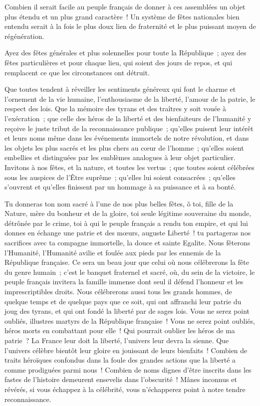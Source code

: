\documentclass[french,twoside]{book} %
\begin{document}
Combien il serait facile au peuple français de donner à ces assemblées un objet plus étendu et un plus grand caractère ! Un système de fêtes nationales bien entendu serait à la fois le plus doux lien de fraternité et le plus puissant moyen de régénération.\par
Ayez des fêtes générales et plus solennelles pour toute la République ; ayez des fêtes particulières et pour chaque lieu, qui soient des jours de repos, et qui remplacent ce que les circonstances ont détruit.\par
Que toutes tendent à réveiller les sentiments généreux qui font le charme et l’ornement de la vie humaine, l’enthousiasme de la liberté, l’amour de la patrie, le respect des lois. Que la mémoire des tyrans et des traîtres y soit vouée à l’exécration ; que celle des héros de la liberté et des bienfaiteurs de l’humanité y reçoive le juste tribut de la reconnaissance publique ; qu’elles puisent leur intérêt et leurs noms même dans les événements immortels de notre révolution, et dans les objets les plus sacrés et les plus chers au cœur de l’homme ; qu’elles soient embellies et distinguées par les emblèmes analogues à leur objet particulier. Invitons à nos fêtes, et la nature, et toutes les vertus ; que toutes soient célébrées sous les auspices de l’Être suprême ; qu’elles lui soient consacrées ; qu’elles s’ouvrent et qu’elles finissent par un hommage à sa puissance et à sa bonté.\par
Tu donneras ton nom sacré à l’une de nos plus belles fêtes, ô toi, fille de la Nature, mère du bonheur et de la gloire, toi seule légitime souveraine du monde, détrônée par le crime, toi à qui le peuple français a rendu ton empire, et qui lui donnes en échange une patrie et des mœurs, auguste Liberté ! tu partageras nos sacrifices avec ta compagne immortelle, la douce et sainte Egalite. Nous fêterons l’Humanité, l’Humanité avilie et foulée aux pieds par les ennemis de la République française. Ce sera un beau jour que celui où nous célébrerons la fête du genre humain ; c’est le banquet fraternel et sacré, où, du sein de la victoire, le peuple français invitera la famille immense dont seul il défend l’honneur et les imprescriptibles droits. Nous célébrerons aussi tous les grands hommes, de quelque temps et de quelque pays que ce soit, qui ont affranchi leur patrie du joug des tyrans, et qui ont fondé la liberté par de sages lois. Vous ne serez point oubliés, illustres martyrs de la République française ! Vous ne serez point oubliés, héros morts en combattant pour elle ! Qui pourrait oublier les héros de ma patrie ? La France leur doit la liberté, l’univers leur devra la sienne. Que l’univers célèbre bientôt leur gloire en jouissant de leurs bienfaits ! Combien de traits héroïques confondus dans la foule des grandes actions que la liberté a comme prodiguées parmi nous ! Combien de noms dignes d’être inscrits dans les fastes de l’histoire demeurent ensevelis dans l’obscurité ! Mânes inconnus et révérés, si vous échappez à la célébrité, vous n’échapperez point à notre tendre reconnaissance.\par
\end{document}
